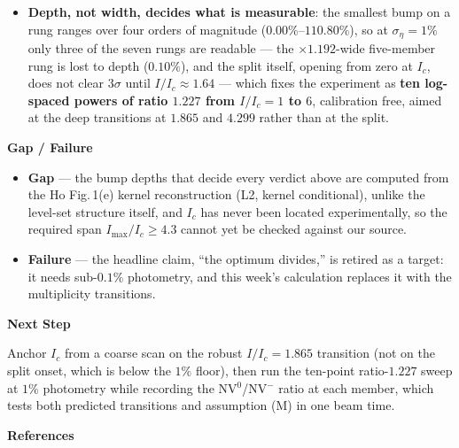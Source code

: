 \documentclass[11pt,a4paper]{ltjsarticle}
\newcommand{\sectionblock}[1]{%
  \vspace{2mm}
  {\large\textbf{#1}}
  \vspace{1mm}

}
\begin{document}
\begin{itemize}[leftmargin=8mm]
  \item \textbf{Depth, not width, decides what is measurable}: the smallest bump on a rung ranges over four orders of magnitude ($0.00\%$--$110.80\%$), so at $\sigma_\eta = 1\%$ only three of the seven rungs are readable --- the $\times1.192$-wide five-member rung is lost to depth ($0.10\%$), and the split itself, opening from zero at $I_c$, does not clear $3\sigma$ until $I/I_c \approx 1.64$ --- which fixes the experiment as \textbf{ten log-spaced powers of ratio $1.227$ from $I/I_c = 1$ to $6$}, calibration free, aimed at the deep transitions at $1.865$ and $4.299$ rather than at the split.
\end{itemize}

\sectionblock{Gap / Failure}

\begin{itemize}[leftmargin=8mm]
  \item \textbf{Gap} --- the bump depths that decide every verdict above are computed from the Ho Fig.\,1(e) kernel reconstruction (L2, kernel conditional), unlike the level-set structure itself, and $I_c$ has never been located experimentally, so the required span $I_{\max}/I_c \ge 4.3$ cannot yet be checked against our source.
  \item \textbf{Failure} --- the headline claim, ``the optimum divides,'' is retired as a target: it needs sub-$0.1\%$ photometry, and this week's calculation replaces it with the multiplicity transitions.
\end{itemize}

\sectionblock{Next Step}

Anchor $I_c$ from a coarse scan on the robust $I/I_c = 1.865$ transition (not on the split onset, which is below the $1\%$ floor), then run the ten-point ratio-$1.227$ sweep at $1\%$ photometry while recording the NV$^0$/NV$^-$ ratio at each member, which tests both predicted transitions and assumption (M) in one beam time.

\sectionblock{References}
\end{document}
